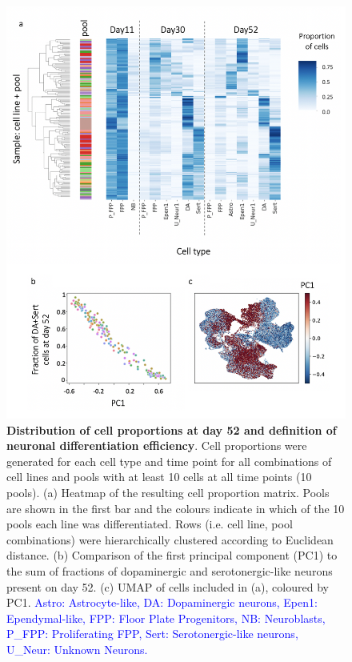 \begin{figure}[htbp]
\centering
\includegraphics[width=14cm]{Chapter5/Fig/neuroseq_define_diff_efficiency.png}
\caption[Definition of neuronal differentiation efficiency]{\textbf{Distribution of cell proportions at day 52 and definition of neuronal differentiation efficiency}.
Cell proportions were generated for each cell type and time point for all combinations of cell lines and pools with at least 10 cells at all time points (10 pools). 
(a) Heatmap of the resulting cell proportion matrix. 
Pools are shown in the first bar and the colours indicate in which of the 10 pools each line was differentiated. 
Rows (i.e. cell line, pool combinations) were hierarchically clustered according to Euclidean distance. 
(b) Comparison of the first principal component (PC1) to the sum of fractions of dopaminergic and serotonergic-like neurons present on day 52.
(c) UMAP of cells included in (a), coloured by PC1.
\textcolor{blue}{Astro: Astrocyte-like, DA: Dopaminergic neurons, Epen1: Ependymal-like, FPP: Floor Plate Progenitors, NB: Neuroblasts, P\_FPP: Proliferating FPP, Sert: Serotonergic-like neurons, U\_Neur: Unknown Neurons.}}
\label{fig:neuroseq_diff_efficiency}
\end{figure}

